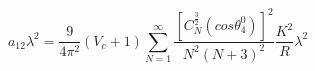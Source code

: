 \begin{equation}
a_{12}\lambda^2 = \frac{9}{4\pi^2}(V_c + 1)\sum_{N=1}^{\infty}\frac{[C_N^{\frac{3}{2}}(cos{\theta_4^0})]^2}{N^2(N+3)^2}\frac{K^2}{R}
\lambda^2
\end{equation}

